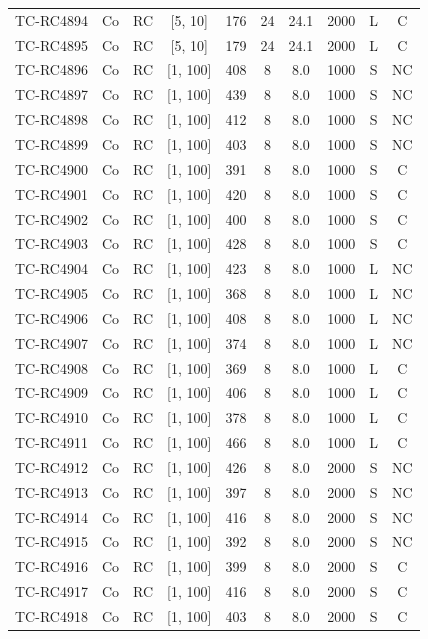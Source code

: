 \begin{longtable}{lccccccccc}
TC-RC4894 & Co & RC & [5, 10] & 176 & 24 & 24.1 & 2000 & L & C \\
TC-RC4895 & Co & RC & [5, 10] & 179 & 24 & 24.1 & 2000 & L & C \\
TC-RC4896 & Co & RC & [1, 100] & 408 & 8 & 8.0 & 1000 & S & NC \\
TC-RC4897 & Co & RC & [1, 100] & 439 & 8 & 8.0 & 1000 & S & NC \\
TC-RC4898 & Co & RC & [1, 100] & 412 & 8 & 8.0 & 1000 & S & NC \\
TC-RC4899 & Co & RC & [1, 100] & 403 & 8 & 8.0 & 1000 & S & NC \\
TC-RC4900 & Co & RC & [1, 100] & 391 & 8 & 8.0 & 1000 & S & C \\
TC-RC4901 & Co & RC & [1, 100] & 420 & 8 & 8.0 & 1000 & S & C \\
TC-RC4902 & Co & RC & [1, 100] & 400 & 8 & 8.0 & 1000 & S & C \\
TC-RC4903 & Co & RC & [1, 100] & 428 & 8 & 8.0 & 1000 & S & C \\
TC-RC4904 & Co & RC & [1, 100] & 423 & 8 & 8.0 & 1000 & L & NC \\
TC-RC4905 & Co & RC & [1, 100] & 368 & 8 & 8.0 & 1000 & L & NC \\
TC-RC4906 & Co & RC & [1, 100] & 408 & 8 & 8.0 & 1000 & L & NC \\
TC-RC4907 & Co & RC & [1, 100] & 374 & 8 & 8.0 & 1000 & L & NC \\
TC-RC4908 & Co & RC & [1, 100] & 369 & 8 & 8.0 & 1000 & L & C \\
TC-RC4909 & Co & RC & [1, 100] & 406 & 8 & 8.0 & 1000 & L & C \\
TC-RC4910 & Co & RC & [1, 100] & 378 & 8 & 8.0 & 1000 & L & C \\
TC-RC4911 & Co & RC & [1, 100] & 466 & 8 & 8.0 & 1000 & L & C \\
TC-RC4912 & Co & RC & [1, 100] & 426 & 8 & 8.0 & 2000 & S & NC \\
TC-RC4913 & Co & RC & [1, 100] & 397 & 8 & 8.0 & 2000 & S & NC \\
TC-RC4914 & Co & RC & [1, 100] & 416 & 8 & 8.0 & 2000 & S & NC \\
TC-RC4915 & Co & RC & [1, 100] & 392 & 8 & 8.0 & 2000 & S & NC \\
TC-RC4916 & Co & RC & [1, 100] & 399 & 8 & 8.0 & 2000 & S & C \\
TC-RC4917 & Co & RC & [1, 100] & 416 & 8 & 8.0 & 2000 & S & C \\
TC-RC4918 & Co & RC & [1, 100] & 403 & 8 & 8.0 & 2000 & S & C \\

\end{longtable}
